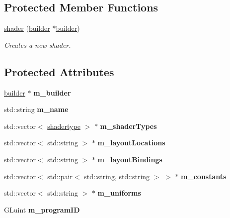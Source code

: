 \subsection*{Protected Member Functions}
\begin{DoxyCompactItemize}
\item 
\hyperlink{classflounder_1_1shader_ae8c052148333a4c06a4dd31b56b072cf}{shader} (\hyperlink{classflounder_1_1shader_1_1builder}{builder} $\ast$\hyperlink{classflounder_1_1shader_1_1builder}{builder})
\begin{DoxyCompactList}\small\item\em Creates a new shader. \end{DoxyCompactList}\end{DoxyCompactItemize}
\subsection*{Protected Attributes}
\begin{DoxyCompactItemize}
\item 
\mbox{\label{classflounder_1_1shader_a47675b1cb14100368f3ed5ef7338458c}} 
\hyperlink{classflounder_1_1shader_1_1builder}{builder} $\ast$ {\bfseries m\+\_\+builder}
\item 
\mbox{\label{classflounder_1_1shader_aaf406b4f20956f8ae7ca76dc8daad869}} 
std\+::string {\bfseries m\+\_\+name}
\item 
\mbox{\label{classflounder_1_1shader_a7937368d5fb8efdeb1f7c6134c2a4a00}} 
std\+::vector$<$ \hyperlink{structflounder_1_1shadertype}{shadertype} $>$ $\ast$ {\bfseries m\+\_\+shader\+Types}
\item 
\mbox{\label{classflounder_1_1shader_ae59400c4ad8488e858ee043d0417eb1a}} 
std\+::vector$<$ std\+::string $>$ $\ast$ {\bfseries m\+\_\+layout\+Locations}
\item 
\mbox{\label{classflounder_1_1shader_a48e1ade301155186e47e335865fb81cf}} 
std\+::vector$<$ std\+::string $>$ $\ast$ {\bfseries m\+\_\+layout\+Bindings}
\item 
\mbox{\label{classflounder_1_1shader_a44c9cad46e853ab5991d77e0d0e1fde6}} 
std\+::vector$<$ std\+::pair$<$ std\+::string, std\+::string $>$ $>$ $\ast$ {\bfseries m\+\_\+constants}
\item 
\mbox{\label{classflounder_1_1shader_a121ff2a41dd77d13e9c75e6a17f03770}} 
std\+::vector$<$ std\+::string $>$ $\ast$ {\bfseries m\+\_\+uniforms}
\item 
\mbox{\label{classflounder_1_1shader_a308e8bf681df24612a43a165948c1a21}} 
G\+Luint {\bfseries m\+\_\+program\+ID}
\end{DoxyCompactItemize}
